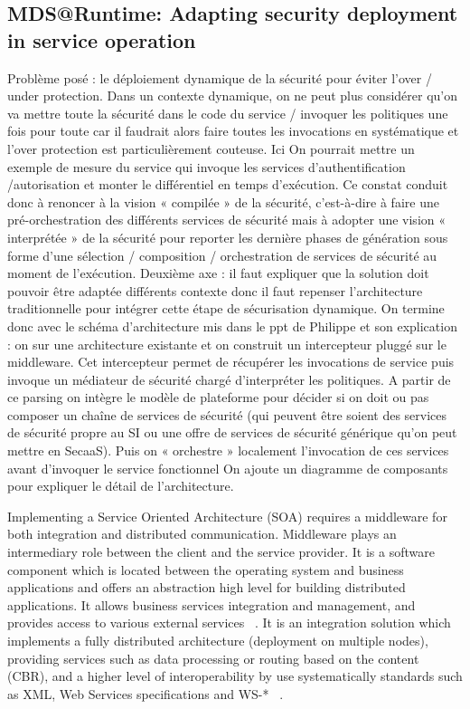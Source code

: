 \documentclass[runningheads,a4paper]{llncs}
\begin{document}
\subsection{MDS@Runtime: Adapting security deployment in service operation}
Probl\`eme pos\'e : le d\'eploiement dynamique de la s\'ecurit\'e pour \'eviter l’over / under protection. Dans un contexte dynamique, on ne peut plus consid\'erer qu’on va mettre toute la s\'ecurit\'e dans le code du service / invoquer les politiques  une fois pour toute car il faudrait alors faire toutes les invocations en syst\'ematique et l’over protection est particuli\`erement couteuse. Ici On pourrait mettre un exemple de mesure du service qui invoque les services d’authentification /autorisation et monter le diff\'erentiel en temps d’ex\'ecution. Ce constat conduit donc \`a renoncer \`a la vision « compil\'ee » de la s\'ecurit\'e, c’est-\`a-dire \`a faire une pr\'e-orchestration des diff\'erents services de s\'ecurit\'e mais \`a adopter une vision « interpr\'et\'ee » de la s\'ecurit\'e pour reporter les derni\`ere phases de g\'en\'eration sous forme d’une s\'election / composition / orchestration de services de s\'ecurit\'e au moment de l’ex\'ecution.
Deuxi\`eme axe : il faut expliquer que la solution doit pouvoir \^etre adapt\'ee  diff\'erents contexte donc il faut repenser l’architecture traditionnelle pour int\'egrer cette \'etape de s\'ecurisation dynamique. On termine donc avec le sch\'ema d’architecture mis dans le ppt de Philippe et son explication : on sur une architecture existante et on construit  un intercepteur plugg\'e sur le middleware. Cet intercepteur permet de r\'ecup\'erer les invocations de service puis invoque un m\'ediateur de s\'ecurit\'e charg\'e d’interpr\'eter les politiques. A partir de ce parsing on int\`egre le mod\`ele de plateforme pour d\'ecider si on doit ou pas composer un chaîne de services de s\'ecurit\'e (qui peuvent \^etre soient des services de s\'ecurit\'e propre au SI ou une offre de services de s\'ecurit\'e g\'en\'erique qu’on peut mettre en SecaaS). Puis on « orchestre » localement l’invocation de ces services avant d’invoquer le service fonctionnel
On ajoute un diagramme de composants pour expliquer le d\'etail de l’architecture.

Implementing a Service Oriented Architecture (SOA) requires a middleware for both integration and distributed communication. Middleware plays an intermediary role between the client and the service provider. It is a software component which is located between the operating system and business applications and offers an abstraction high level for building distributed applications. It allows business services integration and management, and provides access to various external services ~\cite{SHLP05}. It is an integration solution which implements a fully distributed architecture (deployment on multiple nodes), providing services such as data processing or routing based on the content (CBR), and a higher level of interoperability by use systematically standards such as XML, Web Services specifications and WS-* ~\cite{Lou08}.
 
\end{document}
